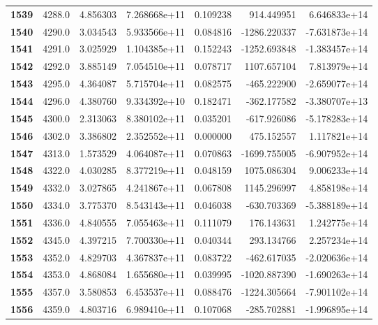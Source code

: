 \documentclass{report}[12pt]
\begin{document}
\begin{center}
\begin{tabular}{lrrrrrr}
\textbf{1539} &         4288.0 &   4.856303 &  7.268668e+11 &    0.109238 &   914.449951 &  6.646833e+14 \\
\textbf{1540} &         4290.0 &   3.034543 &  5.933566e+11 &    0.084816 & -1286.220337 & -7.631873e+14 \\
\textbf{1541} &         4291.0 &   3.025929 &  1.104385e+11 &    0.152243 & -1252.693848 & -1.383457e+14 \\
\textbf{1542} &         4292.0 &   3.885149 &  7.054510e+11 &    0.078717 &  1107.657104 &  7.813979e+14 \\
\textbf{1543} &         4295.0 &   4.364087 &  5.715704e+11 &    0.082575 &  -465.222900 & -2.659077e+14 \\
\textbf{1544} &         4296.0 &   4.380760 &  9.334392e+10 &    0.182471 &  -362.177582 & -3.380707e+13 \\
\textbf{1545} &         4300.0 &   2.313063 &  8.380102e+11 &    0.035201 &  -617.926086 & -5.178283e+14 \\
\textbf{1546} &         4302.0 &   3.386802 &  2.352552e+11 &    0.000000 &   475.152557 &  1.117821e+14 \\
\textbf{1547} &         4313.0 &   1.573529 &  4.064087e+11 &    0.070863 & -1699.755005 & -6.907952e+14 \\
\textbf{1548} &         4322.0 &   4.030285 &  8.377219e+11 &    0.048159 &  1075.086304 &  9.006233e+14 \\
\textbf{1549} &         4332.0 &   3.027865 &  4.241867e+11 &    0.067808 &  1145.296997 &  4.858198e+14 \\
\textbf{1550} &         4334.0 &   3.775370 &  8.543143e+11 &    0.046038 &  -630.703369 & -5.388189e+14 \\
\textbf{1551} &         4336.0 &   4.840555 &  7.055463e+11 &    0.111079 &   176.143631 &  1.242775e+14 \\
\textbf{1552} &         4345.0 &   4.397215 &  7.700330e+11 &    0.040344 &   293.134766 &  2.257234e+14 \\
\textbf{1553} &         4352.0 &   4.829703 &  4.367837e+11 &    0.083722 &  -462.617035 & -2.020636e+14 \\
\textbf{1554} &         4353.0 &   4.868084 &  1.655680e+11 &    0.039995 & -1020.887390 & -1.690263e+14 \\
\textbf{1555} &         4357.0 &   3.580853 &  6.453537e+11 &    0.088476 & -1224.305664 & -7.901102e+14 \\
\textbf{1556} &         4359.0 &   4.803716 &  6.989410e+11 &    0.107068 &  -285.702881 & -1.996895e+14 \\

\end{tabular}
\end{center}
\end{document}
